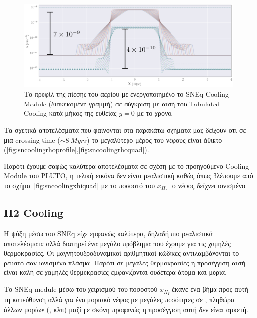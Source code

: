 \documentclass[article,a4paper,11.2pt]{memoir}
\numberwithin{equation}{subsection}
\begin{document}
\begin{figure}[h]
	\begin{adjustwidth}{-0cm}{-5cm}	
	\includegraphics[width=1\linewidth]{DataImages/diffTabCoolSNCoolPRSprofile-edit}
\caption{Το προφίλ της πίεσης του αερίου με ενεργοποιημένο το SNEq Cooling Module (διακεκομένη γραμμή) σε σύγκριση με αυτή του Tabulated Cooling κατά μήκος της ευθείας $y=0$ με το χρόνο.}
\label{fig:difftabcoolsncoolprsprofile-edit}
\end{adjustwidth}
\end{figure}
Τα σχετικά αποτελέσματα που φαίνονται στα παρακάτω σχήματα μας δείχουν οτι σε μια crossing time ($\sim \SI{8}{Myrs}$) το μεγαλύτερο μέρος του νέφους είναι άθικτο (\ref{fig:sncoolingrhoprofile},\ref{fig:sncoolingrhoquad}).   


Παρότι έχουμε σαφώς καλύτερα αποτελέσματα σε σχέση με το προηγούμενο Cooling Module του PLUTO, η τελική εικόνα δεν είναι ρεαλιστική καθώς όπως βλέπουμε από το σχήμα~\ref{fig:sncoolingxhiquad} με το ποσοστό του $x_{H_I}$ το νέφος δείχνει ιονισμένο 

\newpage
	\subsection{H2 Cooling}
	Η ψύξη μέσω του SNEq είχε εμφανώς καλύτερα, δηλαδή πιο ρεαλιστικά αποτελέσματα αλλά διατηρεί ένα μεγάλο πρόβλημα που έχουμε για τις χαμηλές θερμοκρασίες. Οι μαγνητουδροδυναμικοί αριθμητικοί κώδικες αντιλαμβάνονται το ρευστό σαν ιονισμένο πλάσμα. Παρότι σε μεγάλες θερμοκρασίες η προσέγγιση αυτή είναι καλή σε χαμηλές θερμοκρασίες εμφανίζονται ουδέτερα άτομα και μόρια.
	
	Το SNEq module μέσω του χειρισμού του ποσοστού $x_{H_I}$ έκανε ένα βήμα προς αυτή τη κατεύθυνση αλλά για ένα μοριακό νέφος με μεγάλες ποσότητες σε , πληθώρα άλλων μορίων (,  κλπ) μαζί με σκόνη προφανώς η προσέγγιση αυτή δεν είναι αρκετή.
	
\end{document}
